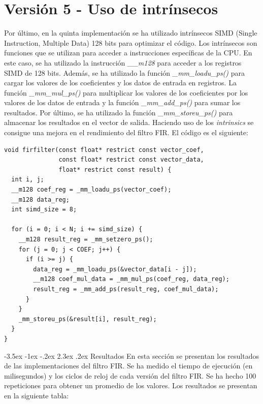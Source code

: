 \documentclass[11pt]{report}
\makeatletter
\renewcommand\chapter{\@startsection{chapter}{0}{\z@}%
    {-3.5ex \@plus -1ex \@minus -.2ex}%
    {2.3ex \@plus.2ex}%
    {\normalfont\Large\bfseries}}
\makeatother
\begin{document}

\section{Versión 5 - Uso de intrínsecos}
Por último, en la quinta implementación se ha utilizado intrínsecos SIMD (Single Instruction, Multiple Data) 128 bits para optimizar el código.
Los intrínsecos son funciones que se utilizan para acceder a instrucciones específicas de la CPU. En este caso, se ha utilizado la instrucción
\emph{\_\_m128} para acceder a los registros SIMD de 128 bits. Además, se ha utilizado la función \emph{\_mm\_loadu\_ps()} para cargar los valores
de los coeficientes y los datos de entrada en registros. La función \emph{\_mm\_mul\_ps()} para multiplicar los valores de los coeficientes por los valores
de los datos de entrada y la función \emph{\_mm\_add\_ps()} para sumar los resultados. Por último, se ha utilizado la función \emph{\_mm\_storeu\_ps()} para
almacenar los resultados en el vector de salida. Haciendo uso de los \emph{intrinsics} se consigue una mejora en el rendimiento del filtro FIR. El código es el siguiente:

\begin{lstlisting}
void firfilter(const float* restrict const vector_coef, 
               const float* restrict const vector_data, 
               float* restrict const result) {
  int i, j;
  __m128 coef_reg = _mm_loadu_ps(vector_coef);  
  __m128 data_reg;
  int simd_size = 8;

  for (i = 0; i < N; i += simd_size) {
    __m128 result_reg = _mm_setzero_ps();
    for (j = 0; j < COEF; j++) {
      if (i >= j) {
        data_reg = _mm_loadu_ps(&vector_data[i - j]);
        __m128 coef_mul_data = _mm_mul_ps(coef_reg, data_reg);
        result_reg = _mm_add_ps(result_reg, coef_mul_data);
      }
    }
    _mm_storeu_ps(&result[i], result_reg);
  }
}
\end{lstlisting}

\chapter{Resultados}
En esta sección se presentan los resultados de las implementaciones del filtro FIR. Se ha medido el tiempo de ejecución (en milisegundos) y los ciclos de reloj de cada versión
del filtro FIR. Se ha hecho 100 repeticiones para obtener un promedio de los valores. Los resultados se presentan en la siguiente tabla:
\end{document}
